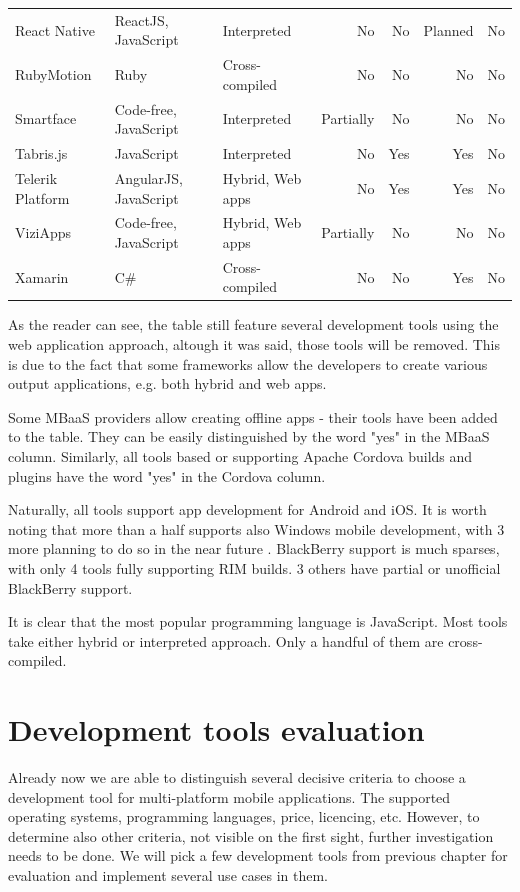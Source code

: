\documentclass[english,master,public,dept460,male,cpdeclaration,oneside]{diploma}
\begin{document}
\begin{table}
\begin{tabular}{l l l r r r r}
		React Native & ReactJS, JavaScript & Interpreted & No & No & Planned & No \\
		RubyMotion & Ruby & Cross-compiled & No & No & No & No \\
		Smartface & Code-free, JavaScript & Interpreted & Partially & No & No & No \\
		Tabris.js & JavaScript & Interpreted & No & Yes & Yes & No \\
		Telerik Platform & AngularJS, JavaScript & Hybrid, Web apps & No & Yes & Yes & No \\
		ViziApps & Code-free, JavaScript & Hybrid, Web apps & Partially & No & No & No \\
		Xamarin & C\# & Cross-compiled & No & No & Yes & No \\
		\midrule
	\end{tabular}
\end{table}

As the reader can see, the table still feature several development tools using the web application approach, altough it was said, those tools will be removed. This is due to the fact that some frameworks allow the developers to create various output applications, e.g. both hybrid and web apps.

Some MBaaS providers allow creating offline apps - their tools have been added to the table. They can be easily distinguished by the word "yes" in the MBaaS column. Similarly, all tools based or supporting Apache Cordova builds and plugins have the word "yes" in the Cordova column.

Naturally, all tools support app development for Android and iOS. It is worth noting that more than a half supports also Windows mobile development, with 3 more planning to do so in the near future \cite{codenameOneWinSupport} \cite{nativeScriptWinSupport} \cite{reactNativeWinSupport}. BlackBerry support is much sparses, with only 4 tools fully supporting RIM builds. 3 others have partial or unofficial BlackBerry support.

It is clear that the most popular programming language is JavaScript. Most tools take either hybrid or interpreted approach. Only a handful of them are cross-compiled.



\section{Development tools evaluation}
Already now we are able to distinguish several decisive criteria to choose a development tool for multi-platform mobile applications. The supported operating systems, programming languages, price, licencing, etc. However, to determine also other criteria, not visible on the first sight, further investigation needs to be done. We will pick a few development tools from previous chapter for evaluation and implement several use cases in them.
\end{document}
